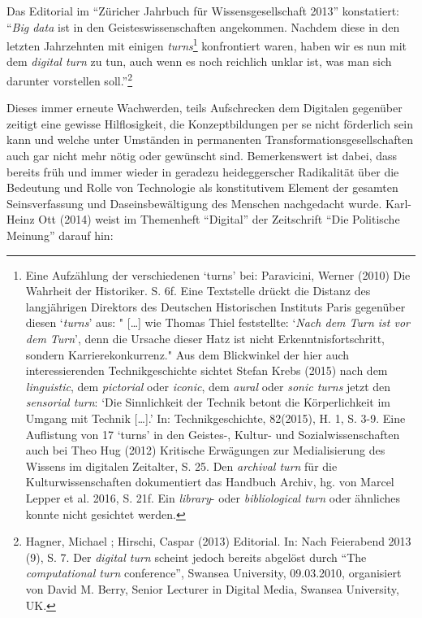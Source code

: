 \documentclass[a4paper,
fontsize=11pt,
oneside,
numbers=noperiodatend,
parskip=half-,
bibliography=totoc,
final
]{scrartcl}
\begin{document}
Das Editorial im \enquote{Züricher Jahrbuch für Wissensgesellschaft
2013} konstatiert: \enquote{\emph{Big data} ist in den
Geisteswissenschaften angekommen. Nachdem diese in den letzten
Jahrzehnten mit einigen \emph{turns}\footnote{Eine Aufzählung der
  verschiedenen \enquote{turns} bei: Paravicini, Werner (2010) Die
  Wahrheit der Historiker. S. 6f. Eine Textstelle drückt die Distanz des
  langjährigen Direktors des Deutschen Historischen Instituts Paris
  gegenüber diesen \enquote{\emph{turns}} aus: " {[}\ldots{}{]} wie
  Thomas Thiel feststellte: \enquote{\emph{Nach dem Turn ist vor dem
  Turn}}, denn die Ursache dieser Hatz ist nicht Erkenntnisfortschritt,
  sondern Karrierekonkurrenz." Aus dem Blickwinkel der hier auch
  interessierenden Technikgeschichte sichtet Stefan Krebs (2015) nach
  dem \emph{linguistic}, dem \emph{pictorial} oder \emph{iconic}, dem
  \emph{aural} oder \emph{sonic turns} jetzt den \emph{sensorial turn}:
  \enquote{Die Sinnlichkeit der Technik betont die Körperlichkeit im
  Umgang mit Technik {[}\ldots{}{]}.} In: Technikgeschichte, 82(2015),
  H. 1, S. 3-9. Eine Auflistung von 17 \enquote{turns} in den Geistes-,
  Kultur- und Sozialwissenschaften auch bei Theo Hug (2012) Kritische
  Erwägungen zur Medialisierung des Wissens im digitalen Zeitalter, S.
  25. Den \emph{archival turn} für die Kulturwissenschaften dokumentiert
  das Handbuch Archiv, hg. von Marcel Lepper et al. 2016, S. 21f. Ein
  \emph{library}- oder \emph{bibliological turn} oder ähnliches konnte
  nicht gesichtet werden.} konfrontiert waren, haben wir es nun mit dem
\emph{digital turn} zu tun, auch wenn es noch reichlich unklar ist, was
man sich darunter vorstellen soll.}\footnote{Hagner, Michael ; Hirschi,
  Caspar (2013) Editorial. In: Nach Feierabend 2013 (9), S. 7. Der
  \emph{digital turn} scheint jedoch bereits abgelöst durch \enquote{The
  \emph{computational turn} conference}, Swansea University, 09.03.2010,
  organisiert von David M. Berry, Senior Lecturer in Digital Media,
  Swansea University, UK.}

Dieses immer erneute Wachwerden, teils Aufschrecken dem Digitalen
gegenüber zeitigt eine gewisse Hilflosigkeit, die Konzeptbildungen per
se nicht förderlich sein kann und welche unter Umständen in permanenten
Transformationsgesellschaften auch gar nicht mehr nötig oder gewünscht
sind. Bemerkenswert ist dabei, dass bereits früh und immer wieder in
geradezu heideggerscher Radikalität über die Bedeutung und Rolle von
Technologie als konstitutivem Element der gesamten Seinsverfassung und
Daseinsbewältigung des Menschen nachgedacht wurde. Karl-Heinz Ott (2014)
weist im Themenheft \enquote{Digital} der Zeitschrift \enquote{Die
Politische Meinung} darauf hin:
\end{document}
